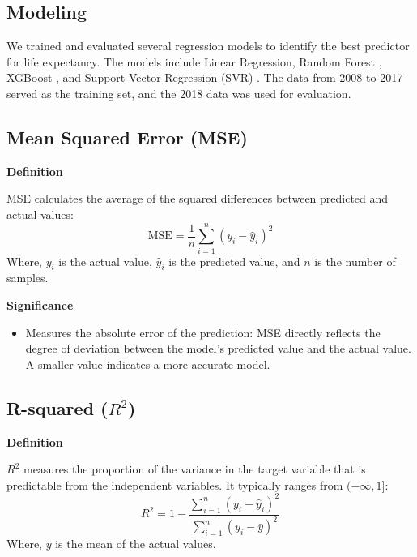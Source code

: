 \documentclass{article}
\begin{document}
\subsection{Modeling}
\label{ssec:modeling_life}

We trained and evaluated several regression models to identify the best predictor for life expectancy. 
The models include Linear Regression, Random Forest \cite{Breiman2001}, XGBoost \cite{Friedman2001}, and 
Support Vector Regression (SVR) \cite{Drucker1997}. The data from 2008 to 2017 served as the training set,
 and the 2018 data was used for evaluation.

\subsection*{Mean Squared Error (MSE)}

\textbf{Definition}

MSE calculates the average of the squared differences between predicted and actual values:
\begin{equation}
    \text{MSE} = \frac{1}{n} \sum_{i=1}^{n} (y_i - \hat{y}_i)^2
\end{equation}
Where, $y_i$ is the actual value, $\hat{y}_i$ is the predicted value, and $n$ is the number of samples.

\textbf{Significance}
\begin{itemize}
    \item Measures the absolute error of the prediction: MSE directly reflects the degree of deviation between the model's predicted value and the actual value. A smaller value indicates a more accurate model.
\end{itemize}

\subsection*{ R-squared ($R^2$)}

\textbf{Definition}

$R^2$ measures the proportion of the variance in the target variable that is predictable from the independent variables. It typically ranges from $(-\infty, 1]$:
\begin{equation}
    R^2 = 1 - \frac{\sum_{i=1}^{n} (y_i - \hat{y}_i)^2}{\sum_{i=1}^{n} (y_i - \bar{y})^2}
\end{equation}
Where, $\bar{y}$ is the mean of the actual values.
\end{document}
